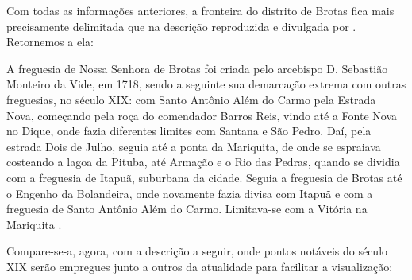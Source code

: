 Com todas as informações anteriores, a fronteira do distrito de Brotas fica mais precisamente delimitada que na descrição reproduzida e divulgada por . Retornemos a ela:

\begin{citacao}
A freguesia de Nossa Senhora de Brotas foi criada pelo arcebispo D. Sebastião Monteiro da Vide, em 1718, sendo a seguinte sua demarcação extrema com outras freguesias, no século XIX: com Santo Antônio Além do Carmo pela Estrada Nova, começando pela roça do comendador Barros Reis, vindo até a Fonte Nova no Dique, onde fazia diferentes limites com Santana e São Pedro. Daí, pela estrada Dois de Julho, seguia até a ponta da Mariquita, de onde se espraiava costeando a lagoa da Pituba, até Armação e o Rio das Pedras, quando se dividia com a freguesia de Itapuã, suburbana da cidade. Seguia a freguesia de Brotas até o Engenho da Bolandeira, onde novamente fazia divisa com Itapuã e com a freguesia de Santo Antônio Além do Carmo. Limitava-se com a Vitória na Mariquita \cite[p.~58]{NASCIMENTO2007}.
\end{citacao}

Compare-se-a, agora, com a descrição a seguir, onde pontos notáveis do século XIX serão empregues junto a outros da atualidade para facilitar a visualização:

